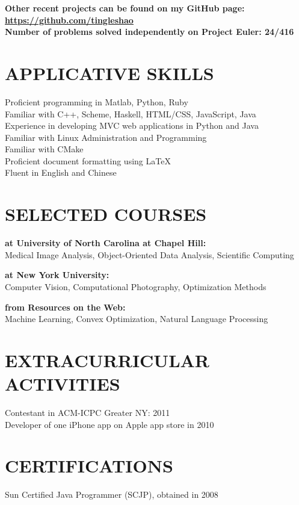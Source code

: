 \documentclass{res}
\begin{document}
\begin{resume}
\begin{tabbing}
    {\bf Other recent projects can be found on my GitHub page: \href{https://github.com/tingleshao}{\underline{https://github.com/tingleshao}}}\\[0.3cm]
    {\bf Number of problems solved independently on Project Euler: 24/416}
  \end{tabbing}

\section{APPLICATIVE SKILLS}
    \vspace{0.05in}
    Proficient programming in Matlab, Python, Ruby  \\
    Familiar with C++, Scheme, Haskell, HTML/CSS, JavaScript, Java\\
    Experience in developing MVC web applications in Python and Java\\
    Familiar with Linux Administration and Programming \\
    Familiar with CMake\\
    Proficient document formatting using \LaTeX \\
    Fluent in English and Chinese

\section{SELECTED COURSES}
     \vspace{-0.05in}	
    \begin{tabbing}
    {\bf at University of North Carolina at Chapel Hill:}\\
    Medical Image Analysis, Object-Oriented Data Analysis, Scientific Computing \\
    \end{tabbing}\vspace{-30pt}
         \begin{tabbing}
    {\bf at New York University:}\\
    Computer Vision, Computational Photography, Optimization Methods\\
        \end{tabbing}\vspace{-30pt}
         \begin{tabbing}
    {\bf from Resources on the Web:}\\
    Machine Learning, Convex Optimization, Natural Language Processing
            \end{tabbing}


\section{EXTRACURRICULAR ACTIVITIES}
    \vspace{0.05in}
    Contestant in ACM-ICPC Greater NY: 2011\\
    Developer of one iPhone app on Apple app store in 2010

 \section{CERTIFICATIONS}
  \vspace{0.05in}
    Sun Certified Java Programmer (SCJP), obtained in 2008\\

\end{resume}
\end{document}
